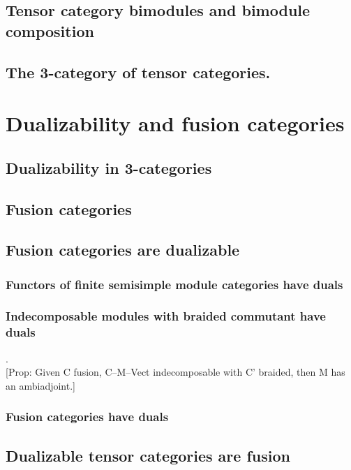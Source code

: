 \documentclass{amsart}
\begin{document}
\subsection{Tensor category bimodules and bimodule composition}

\subsection{The 3-category of tensor categories.}

\section{Dualizability and fusion categories}

\subsection{Dualizability in 3-categories}

\subsection{Fusion categories}

\subsection{Fusion categories are dualizable}

\subsubsection{Functors of finite semisimple module categories have duals}

\subsubsection{Indecomposable modules with braided commutant have duals} .\\

	[Prop: Given C fusion, C--M--Vect indecomposable with C' braided, then M has an ambiadjoint.]

\subsubsection{Fusion categories have duals}

\subsection{Dualizable tensor categories are fusion}
\end{document}
